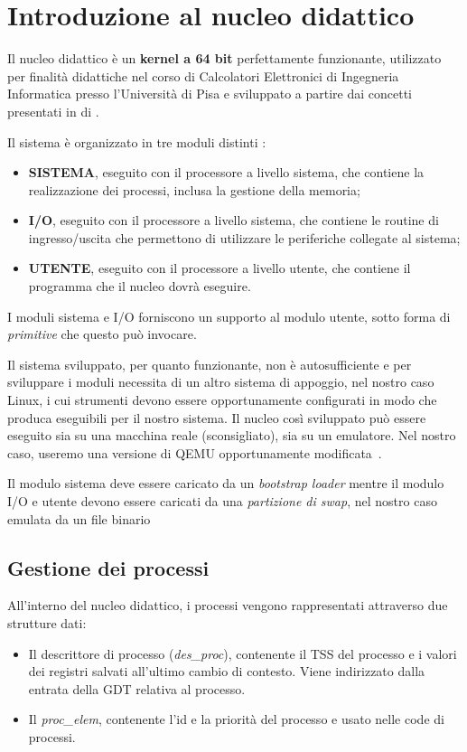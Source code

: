 \chapter{Introduzione al nucleo didattico}
Il nucleo didattico è un \textbf{kernel a 64 bit} perfettamente funzionante, utilizzato per finalità didattiche nel corso di Calcolatori Elettronici di Ingegneria Informatica presso l'Università di Pisa e sviluppato a partire dai concetti presentati in  di \citeauthor{frosini:calcolatori3}\cite{frosini:calcolatori3}.

Il sistema è organizzato in tre moduli distinti \cite{lettieri:nucleo}:
\begin{itemize}
	\item \textbf{SISTEMA}, eseguito con il processore a livello sistema, che contiene la realizzazione dei processi, inclusa la gestione della memoria;
	\item \textbf{I/O}, eseguito con il processore a livello sistema, che contiene le routine di ingresso/uscita che permettono di utilizzare le periferiche collegate al sistema;
	\item \textbf{UTENTE}, eseguito con il processore a livello utente, che contiene il programma che il nucleo dovrà eseguire.
\end{itemize}
I moduli sistema e I/O forniscono un supporto al modulo utente, sotto forma di \emph{primitive} che questo può invocare.

Il sistema sviluppato, per quanto funzionante, non è autosufficiente e per sviluppare i moduli necessita di un altro sistema di appoggio, nel nostro caso Linux, i cui strumenti devono essere opportunamente configurati in modo che produca eseguibili per il nostro sistema. Il nucleo così sviluppato può essere eseguito sia su una macchina reale (sconsigliato), sia su un emulatore. Nel nostro caso, useremo una versione di QEMU opportunamente modificata~\cite{lettieri:istruzioni-nucleo}.

Il modulo sistema deve essere caricato da un \emph{bootstrap loader} mentre il modulo I/O e utente devono essere caricati da una \emph{partizione di swap}, nel nostro caso emulata da un file binario

\section{Gestione dei processi}
All'interno del nucleo didattico, i processi vengono rappresentati attraverso due strutture dati:
\begin{itemize}
	\item Il descrittore di processo (\emph{des\_proc}), contenente il TSS del processo e i valori dei registri salvati all'ultimo cambio di contesto. Viene indirizzato dalla entrata della GDT relativa al processo.
	\item Il \emph{proc\_elem}, contenente l'id e la priorità del processo e usato nelle code di processi.
\end{itemize}

